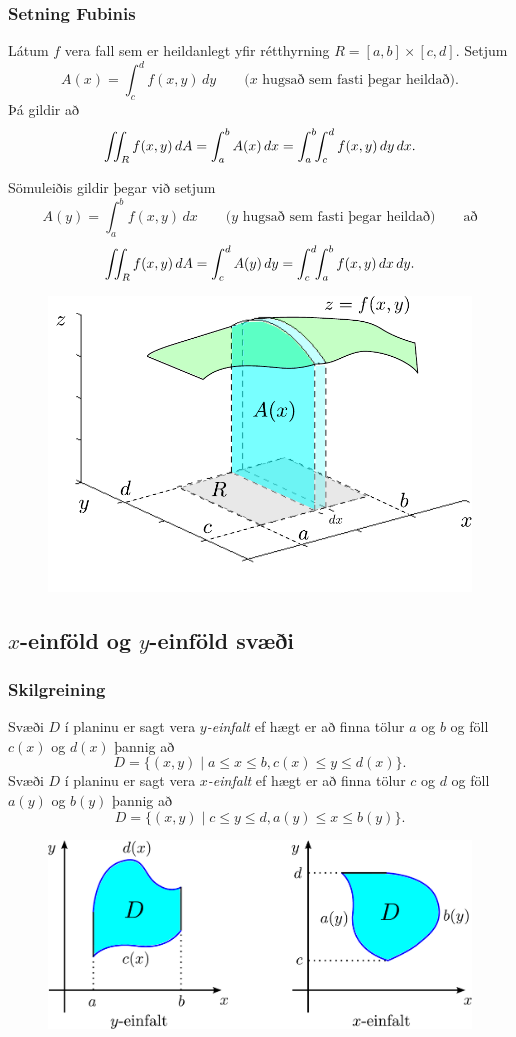 \subsubsection{Setning Fubinis }

Látum $f$ vera fall sem er heildanlegt yfir rétthyrning $R=[a,b]\times
[c,d]$. Setjum
\[A(x)=\int_c^d f(x,y)\,dy\qquad\mbox{($x$ hugsað sem fasti þegar heildað)}.\]
Þá gildir að 
\[\int\!\!\!\int_R f(x,y)\,dA=\int_a^b A(x)\,dx=\int_a^b\!\!\int_c^d
f(x,y)\,dy\,dx.\]

Sömuleiðis gildir þegar við setjum 
\[A(y)=\int_a^b f(x,y)\,dx\qquad\mbox{($y$ hugsað sem fasti þegar heildað)} \qquad \text{að}\]
\[\int\!\!\!\int_R f(x,y)\,dA=\int_c^d A(y)\,dy=\int_c^d\!\!\int_a^b
f(x,y)\,dx\,dy.\]



    \begin {figure}[h!]
 \centering
            \includegraphics[width=0.6\linewidth]{ax1}
            \caption*{}
\end {figure}



\subsection{$x$-einföld og $y$-einföld svæði} 

\subsubsection{Skilgreining }
Svæði $D$ í planinu er sagt vera $y${\em-einfalt}  ef hægt er að finna tölur $a$ og $b$ og föll $c(x)$ og
$d(x)$ þannig að  
$$D=\{(x,y)\mid a\leq x\leq b, c(x)\leq y\leq d(x)\}.$$
Svæði $D$ í planinu er sagt vera $x${\em-einfalt}  ef hægt er að
finna tölur $c$ og $d$ og föll $a(y)$ og $b(y)$ þannig að  
$$D=\{(x,y)\mid c\leq y\leq d, a(y)\leq x\leq b(y)\}.$$

\begin {figure}[h!]
 \centering
            \includegraphics[width=0.65\linewidth]{einfalt}
            \caption*{}
\end {figure}



